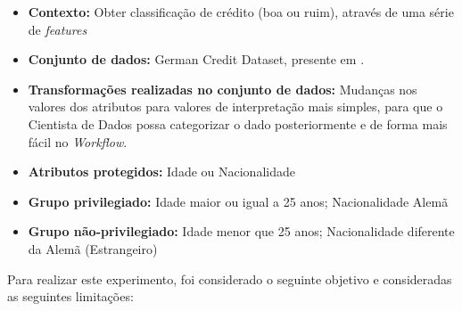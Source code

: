 \documentclass[portugues]{ic-tese}
\begin{document}
\begin{itemize}
\item \textbf{Contexto:} Obter classificação de crédito (boa ou ruim), através de uma série de \textit{features}

\item \textbf{Conjunto de dados:} German Credit Dataset, presente em \citep{ucigerman_2021}.

\item \textbf{Transformações realizadas no conjunto de dados:} Mudanças nos valores dos atributos para valores de interpretação mais simples, para que o Cientista de Dados possa categorizar o dado posteriormente e de forma mais fácil no \textit{Workflow}.

\item \textbf{Atributos protegidos:} Idade ou Nacionalidade

\item \textbf{Grupo privilegiado:} Idade maior ou igual a 25 anos; Nacionalidade Alemã

\item \textbf{Grupo não-privilegiado:} Idade menor que 25 anos; Nacionalidade diferente da Alemã (Estrangeiro)

\end{itemize}

Para realizar este experimento, foi considerado o seguinte objetivo e consideradas as seguintes limitações:
\end{document}
